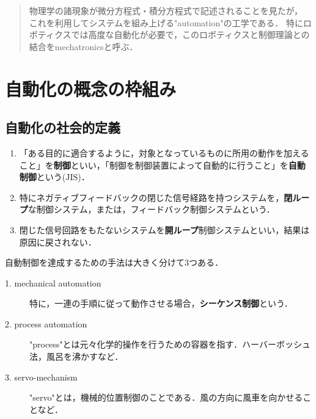 \documentclass[uplatex,dvipdfmx]{jsreport}
\begin{document}
\begin{quotation}
    物理学の諸現象が微分方程式・積分方程式で記述されることを見たが，
    これを利用してシステムを組み上げる"automation"の工学である．
    特にロボティクスでは高度な自動化が必要で，このロボティクスと制御理論との結合をmechatronicsと呼ぶ．
\end{quotation}

\section{自動化の概念の枠組み}

\subsection{自動化の社会的定義}

\begin{definition}\mbox{}
    \begin{enumerate}
        \item 「ある目的に適合するように，対象となっているものに所用の動作を加えること」を\textbf{制御}といい，「制御を制御装置によって自動的に行うこと」を\textbf{自動制御}という(JIS)．
        \item 特にネガティブフィードバックの閉じた信号経路を持つシステムを，\textbf{閉ループ}な制御システム，または，フィードバック制御システムという．
        \item 閉じた信号回路をもたないシステムを\textbf{開ループ}制御システムといい，結果は原因に戻されない．
    \end{enumerate}
\end{definition}

\begin{example}
    自動制御を達成するための手法は大きく分けて3つある．
    \begin{description}
        \item[1. mechanical automation] 特に，一連の手順に従って動作させる場合，\textbf{シーケンス制御}という．
        \item[2. process automation] "process"とは元々化学的操作を行うための容器を指す．ハーバーボッシュ法，風呂を沸かすなど．
        \item[3. servo-mechanism] "servo"とは，機械的位置制御のことである．風の方向に風車を向かせることなど． 
    \end{description}
\end{example}
\end{document}
